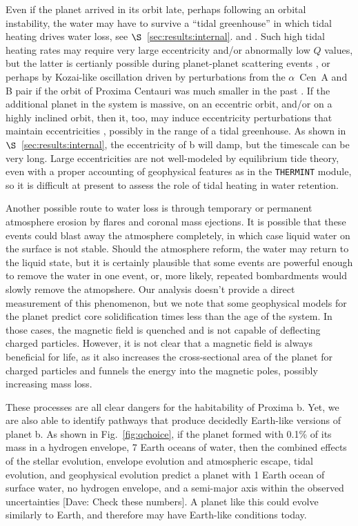 \documentclass[preprint,12pt]{aastex}
\newcommand{\xxx}[1]{{\color{red} #1}} %
\def\acen{{$\alpha$~Cen}}
\def\thermint{\texttt{\footnotesize{THERMINT}}\xspace}
\begin{document}
Even if the planet arrived in its orbit late, perhaps following an
orbital instability, the water may have to survive a ``tidal
greenhouse'' in which tidal heating drives water loss, see
$\S$~\ref{sec:results:internal}. and \citep{Barnes13}. Such high tidal heating
rates may require very large eccentricity and/or abnormally low $Q$
values, but the latter is certianly possible during planet-planet
scattering events \citep{Chatterjee08}, or perhaps by Kozai-like
oscillation driven by perturbations from the \acen~A and B pair if the
orbit of Proxima Centauri was much smaller in the past
\citep{DesideraBarbieri07}. If the additional planet in the system is
massive, on an eccentric orbit, and/or on a highly inclined orbit,
then it, too, may induce eccentricity perturbations that maintain
eccentricities \cite{TakedaRasio05}, possibly in the range of a tidal
greenhouse. As shown in $\S$~\ref{sec:results:internal}, the eccentricity of
b will damp, but the timescale can be very long. Large eccentricities
are not well-modeled by equilibrium tide theory, even with a proper
accounting of geophysical features as in the \thermint module, so it
is difficult at present to assess the role of tidal heating in water
retention.

Another possible route to water loss is through temporary or permanent
atmosphere erosion by flares and coronal mass ejections. It is
possible that these events could blast away the atmosphere completely,
in which case liquid water on the surface is not stable. Should the
atmosphere reform, the water may return to the liquid state, but it is
certainly plausible that some events are powerful enough to remove the
water in one event, or, more likely, repeated bombardments would
slowly remove the atmopshere. Our analysis doesn't provide a direct
measurement of this phenomenon, but we note that some geophysical
models for the planet predict core solidification times less than the
age of the system. In those cases, the magnetic field is quenched and
is not capable of deflecting charged particles. However, it is not
clear that a magnetic field is always beneficial for life, as it also
increases the cross-sectional area of the planet for charged particles
and funnels the energy into the magnetic poles, possibly increasing
mass loss.

These processes are all clear dangers for the habitability of Proxima
b. Yet, we are also able to identify pathways that produce decidedly
Earth-like versions of planet b. \xxx{As shown in Fig.~\ref{fig:qchoice},
if the planet formed with 0.1\% of its mass in a hydrogen envelope, 7
Earth oceans of water, then the combined effects of the stellar
evolution, envelope evolution and atmospheric escape, tidal evolution,
and geophysical evolution predict a planet with 1 Earth ocean of
surface water, no hydrogen envelope, and a semi-major axis within the
observed uncertainties [Dave: Check these numbers]}. A planet like this could evolve similarly to
Earth, and therefore may have Earth-like conditions today.
\end{document}

